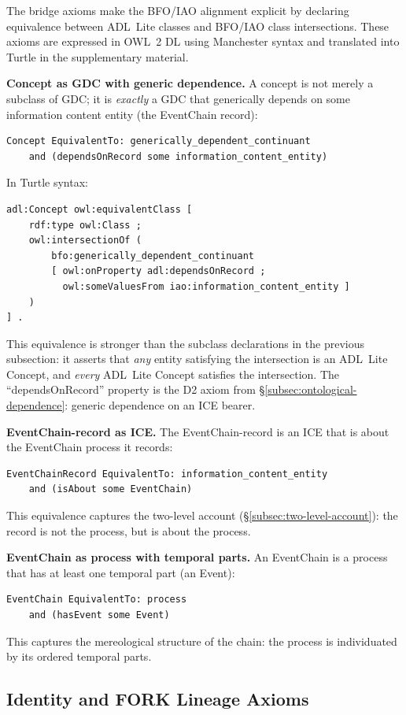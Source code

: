 The bridge axioms make the BFO/IAO alignment explicit by declaring equivalence between ADL~Lite classes and BFO/IAO class intersections. These axioms are expressed in OWL~2 DL using Manchester syntax \cite{owl2} and translated into Turtle in the supplementary material.

\textbf{Concept as GDC with generic dependence.}
A concept is not merely a subclass of GDC; it is \emph{exactly} a GDC that generically depends on some information content entity (the EventChain record):
\begin{verbatim}
Concept EquivalentTo: generically_dependent_continuant
    and (dependsOnRecord some information_content_entity)
\end{verbatim}
In Turtle syntax:
\begin{verbatim}
adl:Concept owl:equivalentClass [
    rdf:type owl:Class ;
    owl:intersectionOf (
        bfo:generically_dependent_continuant
        [ owl:onProperty adl:dependsOnRecord ;
          owl:someValuesFrom iao:information_content_entity ]
    )
] .
\end{verbatim}
This equivalence is stronger than the subclass declarations in the previous subsection: it asserts that \emph{any} entity satisfying the intersection is an ADL~Lite Concept, and \emph{every} ADL~Lite Concept satisfies the intersection. The ``dependsOnRecord'' property is the D2 axiom from \S\ref{subsec:ontological-dependence}: generic dependence on an ICE bearer.

\textbf{EventChain-record as ICE.}
The EventChain-record is an ICE that is about the EventChain process it records:
\begin{verbatim}
EventChainRecord EquivalentTo: information_content_entity
    and (isAbout some EventChain)
\end{verbatim}
This equivalence captures the two-level account (\S\ref{subsec:two-level-account}): the record is not the process, but is about the process.

\textbf{EventChain as process with temporal parts.}
An EventChain is a process that has at least one temporal part (an Event):
\begin{verbatim}
EventChain EquivalentTo: process
    and (hasEvent some Event)
\end{verbatim}
This captures the mereological structure of the chain: the process is individuated by its ordered temporal parts.

\subsection{Identity and FORK Lineage Axioms}

